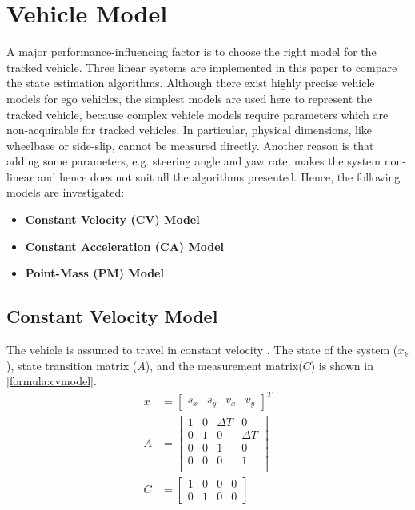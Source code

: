 \section{Vehicle Model}
A major performance-influencing factor is to choose the right model for the tracked vehicle. Three linear systems are implemented in this paper to compare the state estimation algorithms. Although there exist highly precise vehicle models for ego vehicles, the simplest models are used here to represent the tracked vehicle, because complex vehicle models require parameters which are non-acquirable for tracked vehicles. In particular, physical dimensions, like wheelbase or side-slip, cannot be measured directly. Another reason is that adding some parameters, e.g. steering angle and yaw rate, makes the system non-linear and hence does not suit all the algorithms presented. Hence, the following models are investigated:
\begin{itemize}
\item \textbf{Constant Velocity (CV) Model}
\item \textbf{Constant Acceleration (CA) Model}
\item \textbf{Point-Mass (PM) Model}
\end{itemize}
\subsection{Constant Velocity Model}
The vehicle is assumed to travel in constant velocity \cite{Schubert2008}. The state of the system ($x_k$), state transition matrix ($A$), and the measurement matrix($C$) is shown in \eqref{formula:cvmodel}.
\begin{equation}
\label{formula:cvmodel}
\begin{split}
x &=
\left[\begin{matrix}
s_x & s_y & v_x & v_y
\end{matrix}\right]^{T}\\
A&= \left[\begin{matrix}
1 & 0 & \Delta T & 0\\
0 & 1 & 0 & \Delta T\\
0 & 0 & 1 & 0\\
0 & 0 & 0 & 1\\
\end{matrix}\right]\\
C&= \left[\begin{matrix}
1 & 0 & 0 & 0\\
0 & 1 & 0 & 0
\end{matrix}\right]
\end{split}
\end{equation}

